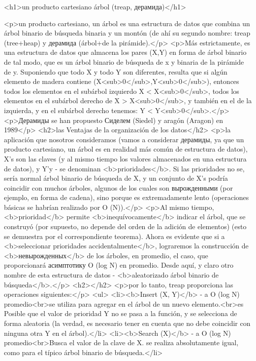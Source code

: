 <h1>un producto cartesiano árbol (treap, дерамида)</h1>

<p>un producto cartesiano, un árbol es una estructura de datos que combina un árbol binario de búsqueda binaria y un montón (de ahí su segundo nombre: treap (tree+heap) y дерамида (árbol+de la pirámide).</p>
<p>Más estrictamente, es una estructura de datos que almacena los pares (X,Y) en forma de árbol binario de tal modo, que es un árbol binario de búsqueda de x y binaria de la pirámide de y. Suponiendo que todo X y todo Y son diferentes, resulta que si algún elemento de madera contiene (X<sub>0</sub>,Y<sub>0</sub>), entonces todos los elementos en el subárbol izquierdo X < X<sub>0</sub>, todos los elementos en el subárbol derecho de X > X<sub>0</sub>, y también en el de la izquierda, y en el subárbol derecho tenemos: Y < Y<sub>0</sub>.</p>
<p>Дерамиды se han propuesto Сиделем (Siedel) y aragón (Aragon) en 1989</p>
<h2>las Ventajas de la organización de los datos</h2>
<p>la aplicación que nosotros consideramos (vamos a considerar дерамиды, ya que un producto cartesiano, un árbol es en realidad más común de estructura de datos), X's son las claves (y al mismo tiempo los valores almacenados en una estructura de datos), y Y'y - se denominan <b>prioridades</b>. Si las prioridades no se, sería normal árbol binario de búsqueda de X, y un conjunto de X's podría coincidir con muchos árboles, algunos de los cuales son вырожденными (por ejemplo, en forma de cadena), sino porque es extremadamente lento (operaciones básicas se habrían realizado por O (N)).</p>
<p>Al mismo tiempo, <b>prioridad</b> permite <b>inequívocamente</b> indicar el árbol, que se construyó (por supuesto, no depende del orden de la adición de elementos) (esto se demuestra por el correspondiente teorema). Ahora es evidente que si a <b>seleccionar prioridades accidentalmente</b>, lograremos la construcción de <b>невырожденных</b> de los árboles, en promedio, el caso, que proporcionará асимптотику O (log N) en promedio. Desde aquí, y claro otro nombre de esta estructura de datos - <b>aleatorizado árbol binario de búsqueda</b>.</p>
<h2></h2>
<p>por lo tanto, treap proporciona las operaciones siguientes:</p>
<ul>
<li><b>Insert (X, Y)</b> - a O (log N) promedio<br>se utiliza para agregar en el árbol de un nuevo elemento.<br>es Posible que el valor de prioridad Y no se pasa a la función, y se selecciona de forma aleatoria (la verdad, es necesario tener en cuenta que no debe coincidir con ninguna otra Y en el árbol).</li>
<li><b>Search (X)</b> - a O (log N) promedio<br>Busca el valor de la clave de X. se realiza absolutamente igual, como para el típico árbol binario de búsqueda.</li>
